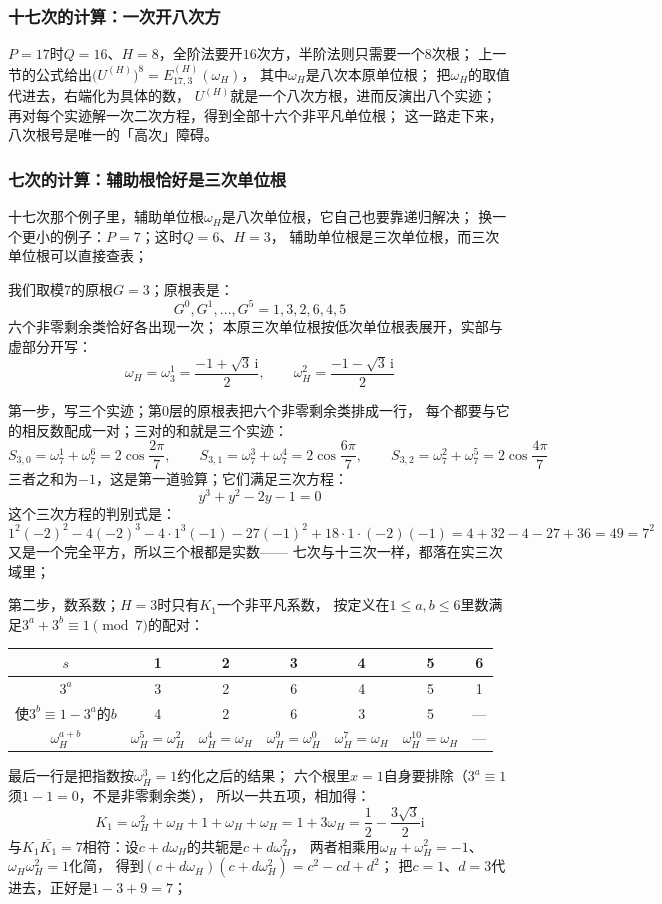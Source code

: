 \documentclass[UTF8,a4paper,11pt]{ctexart}
\newcommand{\ii}{\mathrm{i}}
\begin{document}
\subsubsection{十七次的计算：一次开八次方}
$P=17$时$Q=16$、$H=8$，全阶法要开$16$次方，半阶法则只需要一个$8$次根；
上一节的公式给出$\bigl(U^{(H)}\bigr)^{8}=E^{(H)}_{17,3}(\omega_H)$，
其中$\omega_H$是八次本原单位根；
把$\omega_H$的取值代进去，右端化为具体的数，
$U^{(H)}$就是一个八次方根，进而反演出八个实迹；
再对每个实迹解一次二次方程，得到全部十六个非平凡单位根；
这一路走下来，八次根号是唯一的「高次」障碍。

\subsubsection{七次的计算：辅助根恰好是三次单位根}
十七次那个例子里，辅助单位根$\omega_H$是八次单位根，它自己也要靠递归解决；
换一个更小的例子：$P=7$；这时$Q=6$、$H=3$，
辅助单位根是三次单位根，而三次单位根可以直接查表；

我们取模$7$的原根$G=3$；原根表是：
\[
 G^0,G^1,\dots,G^5=1,3,2,6,4,5
\]
六个非零剩余类恰好各出现一次；
本原三次单位根按低次单位根表展开，实部与虚部分开写：
\[
 \omega_H=\omega_3^1=\frac{-1+\sqrt3\,\ii}{2},\qquad
 \omega_H^2=\frac{-1-\sqrt3\,\ii}{2}
\]

第一步，写三个实迹；第$0$层的原根表把六个非零剩余类排成一行，
每个都要与它的相反数配成一对；三对的和就是三个实迹：
\[
 S_{3,0}=\omega_7^{1}+\omega_7^{6}=2\cos\frac{2\pi}{7},\qquad
 S_{3,1}=\omega_7^{3}+\omega_7^{4}=2\cos\frac{6\pi}{7},\qquad
 S_{3,2}=\omega_7^{2}+\omega_7^{5}=2\cos\frac{4\pi}{7}
\]
三者之和为$-1$，这是第一道验算；它们满足三次方程：
\[
 y^3+y^2-2y-1=0
\]
这个三次方程的判别式是：
\[
 1^2(-2)^2-4(-2)^3-4\cdot1^3(-1)-27(-1)^2+18\cdot1\cdot(-2)(-1)
 =4+32-4-27+36=49=7^2
\]
又是一个完全平方，所以三个根都是实数——
七次与十三次一样，都落在实三次域里；\par

第二步，数系数；$H=3$时只有$K_1$一个非平凡系数，
按定义在$1\le a,b\le6$里数满足$3^a+3^b\equiv1\pmod7$的配对：
\begin{center}
\begin{tabular}{c|cccccc}
\toprule
$s$ & 1&2&3&4&5&6\\
\midrule
$3^a$ & 3&2&6&4&5&1\\
\midrule
使$3^b\equiv1-3^a$的$b$ & 4&2&6&3&5&---\\
$\omega_H^{a+b}$ & $\omega_H^5=\omega_H^2$ & $\omega_H^4=\omega_H$ & $\omega_H^9=\omega_H^0$ & $\omega_H^7=\omega_H$ & $\omega_H^{10}=\omega_H$ & ---\\
\bottomrule
\end{tabular}
\end{center}
最后一行是把指数按$\omega_H^3=1$约化之后的结果；
六个根里$x=1$自身要排除（$3^a\equiv1$须$1-1=0$，不是非零剩余类），
所以一共五项，相加得：
\[
 K_1=\omega_H^2+\omega_H+1+\omega_H+\omega_H=1+3\omega_H=\frac12-\frac{3\sqrt3}{2}\ii
\]
与$K_1\overline{K_1}=7$相符：设$c+d\omega_H$的共轭是$c+d\omega_H^2$，
两者相乘用$\omega_H+\omega_H^2=-1$、$\omega_H\omega_H^2=1$化简，
得到$(c+d\omega_H)(c+d\omega_H^2)=c^2-cd+d^2$；
把$c=1$、$d=3$代进去，正好是$1-3+9=7$；\par
\end{document}

